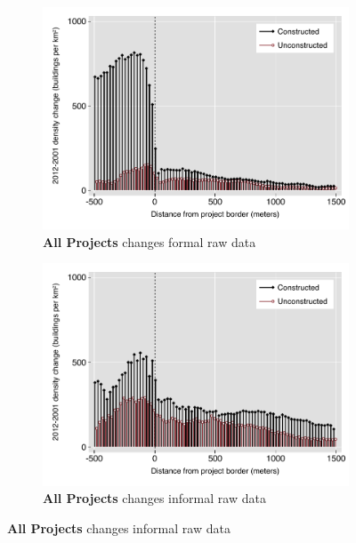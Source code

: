 \documentclass[12pt]{article}
\begin{document}
\begin{figure}
        \centering
        \begin{subfigure}[b]{0.48\textwidth}
            \caption[Network2]%
            {{\footnotesize \textbf{All Projects} changes formal raw data}}    
            \label{fig:prefor}
            \centering
            \includegraphics[width=\textwidth,trim={0.3cm .3cm 0.1cm 0cm}, clip=true]{figures/bblu_for_rawchanges_4_spk.pdf}

        \end{subfigure}
        \hfill
        \begin{subfigure}[b]{0.48\textwidth}  
                    \caption[]%
            {{\footnotesize \textbf{All Projects} changes informal  raw data}}      
            \label{fig:preinf}
            \centering 
            \includegraphics[width=\textwidth,trim={0.3cm .3cm 0.1cm 0cm}, clip=true]{figures/bblu_inf_rawchanges_4_spk.pdf}


\end{subfigure}
\end{figure}
\end{document}
